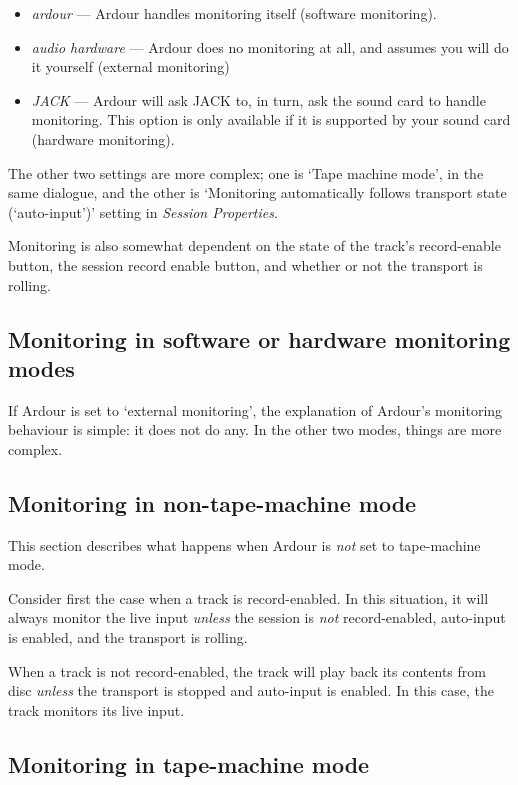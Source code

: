 \documentclass[10pt,a4paper]{book}
\begin{document}
\begin{itemize}
\item \emph{ardour} --- Ardour handles monitoring itself (software monitoring).
\item \emph{audio hardware} --- Ardour does no monitoring at all, and
  assumes you will do it yourself (external monitoring)
\item \emph{JACK} --- Ardour will ask JACK to, in turn, ask the sound
  card to handle monitoring.  This option is only available if it is
  supported by your sound card (hardware monitoring).
\end{itemize}

The other two settings are more complex; one is `Tape machine mode',
in the same dialogue, and the other is `Monitoring automatically
follows transport state (`auto-input')' setting in \emph{Session
  Properties}.

Monitoring is also somewhat dependent on the state of the track's
record-enable button, the session record enable button, and whether or
not the transport is rolling.


\subsection{Monitoring in software or hardware monitoring modes}

If Ardour is set to `external monitoring', the explanation of Ardour's
monitoring behaviour is simple: it does not do any.  In the other two
modes, things are more complex.


\subsection{Monitoring in non-tape-machine mode}

This section describes what happens when Ardour is \emph{not} set to
tape-machine mode.

Consider first the case when a track is record-enabled.  In this
situation, it will always monitor the live input \emph{unless} the
session is \emph{not} record-enabled, auto-input is enabled, and the
transport is rolling.  

When a track is not record-enabled, the track will play back its
contents from disc \emph{unless} the transport is stopped and
auto-input is enabled.  In this case, the track monitors its live
input.


\subsection{Monitoring in tape-machine mode}
\end{document}
